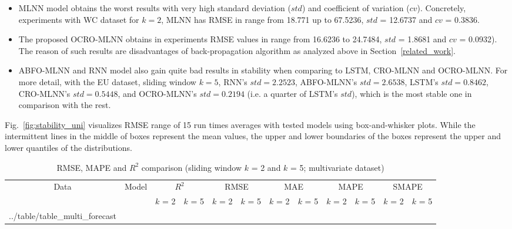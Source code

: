 \documentclass[11pt,twoside]{article}
\makeatletter
\newcommand\primitiveinput[1]
		{\@@input #1 }
\makeatother
\begin{document}
\begin{multicols}{2}
\begin{itemize}
\item MLNN model obtains the worst results with very high standard deviation ($std$) and coefficient of variation ($cv$). Concretely, experiments with WC dataset for $k = 2$, MLNN has RMSE in range from 18.771 up to 67.5236, $std$ = 12.6737 and $cv$ = 0.3836.
\item The proposed OCRO-MLNN obtains in experiments RMSE values in range from 16.6236 to 24.7484, $std$ = 1.8681 and $cv$ = 0.0932). The reason of such results are disadvantages of back-propagation algorithm as analyzed above in Section~\ref{related_work}. 
\item ABFO-MLNN and RNN model also gain quite bad results in stability when comparing to LSTM, CRO-MLNN and OCRO-MLNN. For more detail, with the EU dataset, sliding window $k = 5$, RNN's $std = 2.2523$, ABFO-MLNN's $std = 2.6538$, LSTM's $std = 0.8462$, CRO-MLNN's $std = 0.5448$, and OCRO-MLNN's $std = 0.2194$ (i.e. a quarter of LSTM's $std$), which is the most stable one in comparison with the rest.
\end{itemize}

Fig.~\ref{fig:stability_uni} visualizes RMSE range of 15 run times averages with tested models using box-and-whisker plots. While the intermittent lines in the middle of boxes represent the mean values, the upper and lower boundaries of the boxes represent the upper and lower quantiles of the distributions. 




\begin{table}[!t]
	\caption{RMSE, MAPE and $R^2$ comparison (sliding window $k$ = 2 and $k$ = 5; multivariate dataset)}
	\label{table:multi_forecast}
	\centering
	\begin{adjustbox}{width=0.45\textwidth, angle=270}
	\begin{sideways}
		\begin{tabular}{| c | c | c | c | c | c | c | c | c | c | c | c |}%
			\hline
			\multirow{2}{*}{Data} & \multirow{2}{*}{Model} & \multicolumn{2}{c|}{$R^2$} & \multicolumn{2}{c|}{RMSE} & \multicolumn{2}{c|}{MAE} & \multicolumn{2}{c|}{MAPE}  & \multicolumn{2}{c|}{SMAPE} \\ \cline{3-12}
   				& & $k$ = 2 & $k$ = 5 & $k$ = 2 & $k$ = 5 & $k$ = 2 & $k$ = 5 & $k$ = 2 & $k$ = 5 & $k$ = 2 & $k$ = 5 \\ [0.5ex] 
			\hline
			\primitiveinput{../table/table_multi_forecast}
			\hline
		\end{tabular}
	\end{sideways}
	\end{adjustbox}
\end{table}




\end{multicols}
\end{document}
